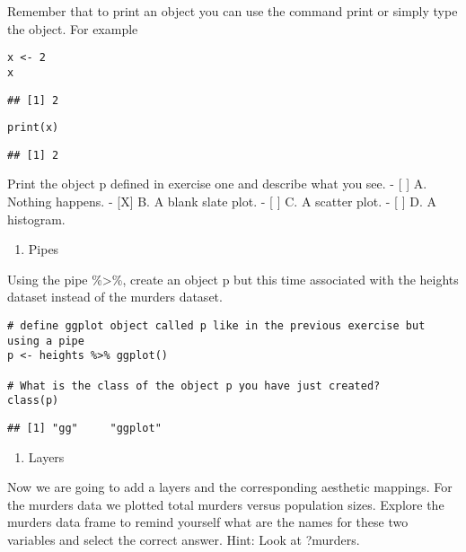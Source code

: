 \documentclass[]{article}
\providecommand{\tightlist}{%
  \setlength{\itemsep}{0pt}\setlength{\parskip}{0pt}}
\begin{document}
Remember that to print an object you can use the command print or simply
type the object. For example

\begin{verbatim}
x <- 2
x
\end{verbatim}

\begin{verbatim}
## [1] 2
\end{verbatim}

\begin{verbatim}
print(x)
\end{verbatim}

\begin{verbatim}
## [1] 2
\end{verbatim}

Print the object p defined in exercise one and describe what you see. -
{[} {]} A. Nothing happens. - {[}X{]} B. A blank slate plot. - {[} {]}
C. A scatter plot. - {[} {]} D. A histogram.

\begin{enumerate}
\def\labelenumi{\arabic{enumi}.}
\setcounter{enumi}{2}
\tightlist
\item
  Pipes
\end{enumerate}

Using the pipe \%\textgreater{}\%, create an object p but this time
associated with the heights dataset instead of the murders dataset.

\begin{verbatim}
# define ggplot object called p like in the previous exercise but using a pipe 
p <- heights %>% ggplot()

# What is the class of the object p you have just created?
class(p)
\end{verbatim}

\begin{verbatim}
## [1] "gg"     "ggplot"
\end{verbatim}

\begin{enumerate}
\def\labelenumi{\arabic{enumi}.}
\setcounter{enumi}{3}
\tightlist
\item
  Layers
\end{enumerate}

Now we are going to add a layers and the corresponding aesthetic
mappings. For the murders data we plotted total murders versus
population sizes. Explore the murders data frame to remind yourself what
are the names for these two variables and select the correct answer.
Hint: Look at ?murders.
\end{document}

